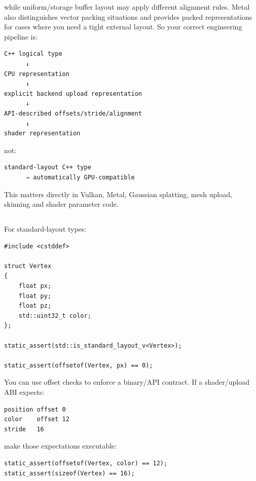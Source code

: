 while uniform/storage buffer layout may apply different alignment rules. Metal also distinguishes vector packing situations and provides packed representations for cases where you need a tight external layout. So your correct engineering pipeline is:

\begin{verbatim}
C++ logical type
      ↓
CPU representation
      ↓
explicit backend upload representation
      ↓
API-described offsets/stride/alignment
      ↓
shader representation
\end{verbatim}

not:

\begin{verbatim}
standard-layout C++ type
      ⇒ automatically GPU-compatible
\end{verbatim}

This matters directly in Vulkan, Metal, Gaussian splatting, mesh upload, skinning and shader parameter code.

\subsection{\texorpdfstring{}{}}\label{05-engine-i-ch003-offsetof}

\hypertarget{05-engine-i-ch003-offsetof}{}

For standard-layout types:

\begin{verbatim}
#include <cstddef>

struct Vertex
{
    float px;
    float py;
    float pz;
    std::uint32_t color;
};

static_assert(std::is_standard_layout_v<Vertex>);

static_assert(offsetof(Vertex, px) == 0);
\end{verbatim}

You can use offset checks to enforce a binary/API contract. If a shader/upload ABI expects:

\begin{verbatim}
position offset 0
color    offset 12
stride   16
\end{verbatim}

make those expectations executable:

\begin{verbatim}
static_assert(offsetof(Vertex, color) == 12);
static_assert(sizeof(Vertex) == 16);
\end{verbatim}

